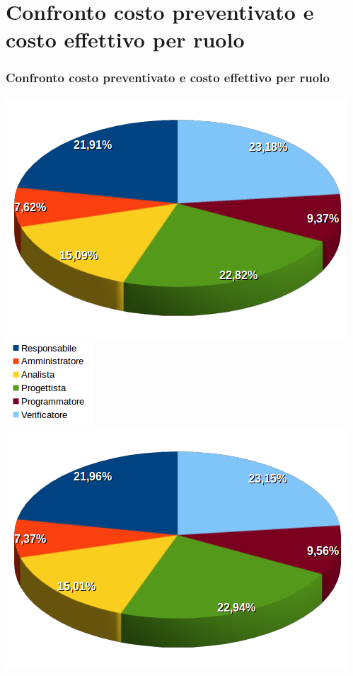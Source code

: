 \section{Confronto costo preventivato e costo effettivo per ruolo}
\begin{frame}
	\frametitle{Confronto costo preventivato e costo effettivo per ruolo}	
	\begin{center}
		\includegraphics[scale=0.23]{img/costoPREVENTIVATOperruolo.png}
		\qquad
		\includegraphics[scale=0.43]{img/legenda.png}
		\qquad
		\includegraphics[scale=0.23]{img/costoEFFETTIVOperruolo.png}	
	\end{center}
	
	
\end{frame}

